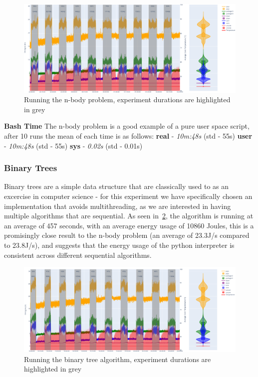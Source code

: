 \begin{figure}[H]
    \centering
    \includegraphics[width=15cm]{figures/implementation/nbody_repeating}
    \caption{Running the n-body problem, experiment durations are highlighted in grey}
    \label{fig:nbody_repeating}
\end{figure}

\textbf{Bash Time}
The n-body problem is a good example of a pure user space script, after 10 runs the mean of each time is as follows:
\textbf{real} - \textit{10m:48s} (std - 55s)
\textbf{user} - \textit{10m:48s} (std - 55s)
\textbf{sys} - \textit{0.02s} (std - 0.01s)

\subsubsection{Binary Trees}
Binary trees are a simple data structure that are classically used to as an excercise in computer science - for this
experiment we have specifically chosen an implementation that avoids multithreading, as we are interested in having
multiple algorithms that are sequential.
As seen in~\ref{fig:btree_repeating}, the algorithm is running at an average of 457 seconds, with an average energy
usage of 10860 Joules, this is a promisingly close result to the n-body problem (an average of 23.3J/s compared to
23.8J/s), and suggests that the energy usage of the python interpreter is consistent across different sequential
algorithms.


\begin{figure}[H]
    \centering
    \includegraphics[width=15cm]{figures/implementation/btree_repeating}
    \caption{Running the binary tree algorithm, experiment durations are highlighted in grey}
    \label{fig:btree_repeating}
\end{figure}


